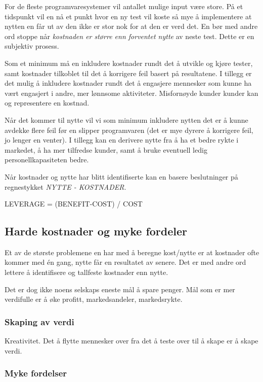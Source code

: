 For de fleste programvaresystemer vil antallet mulige input være store.
På et tidspunkt vil en nå et punkt hvor en ny test vil koste så mye å
implementere at nytten en får ut av den ikke er stor nok for at den er
verd det. En bør med andre ord stoppe når \emph{kostnaden er større enn
forventet nytte} av neste test. Dette er en subjektiv prosess.

Som et minimum må en inkludere kostnader rundt det å utvikle og kjøre
tester, samt kostnader tilkoblet til det å korrigere feil basert på
resultatene. I tillegg er det mulig å inkludere kostnader rundt det å
engasjere mennesker som kunne ha vært engasjert i andre, mer lønnsome
aktiviteter. Misfornøyde kunder kunder kan og representere en kostnad.

Når det kommer til nytte vil vi som minimum inkludere nytten det er å
kunne avdekke flere feil før en slipper programvaren (det er mye dyrere
å korrigere feil, jo lenger en venter). I tillegg kan en derivere nytte
fra å ha et bedre rykte i markedet, å ha mer tilfredse kunder, samt å
bruke eventuell ledig personellkapasiteten bedre.

Når kostnader og nytte har blitt identifiserte kan en basere
beslutninger på regnestykket \emph{NYTTE - KOSTNADER}.

LEVERAGE = (BENEFIT-COST) / COST

\subsection{Harde kostnader og myke fordeler}

Et av de største problemene en har med å beregne kost/nytte er at
kostnader ofte kommer med én gang, nytte får en resultatet av senere.
Det er med andre ord lettere å identifisere og tallfeste kostnader enn
nytte.

Det er dog ikke noens selskaps eneste mål å spare penger. Mål som er mer
verdifulle er å øke profitt, markedsandeler, markedsrykte.

\subsubsection{Skaping av verdi}

Kreativitet. Det å flytte mennesker over fra det å teste over til å
skape er å skape verdi.

\subsubsection{Myke fordelser}

